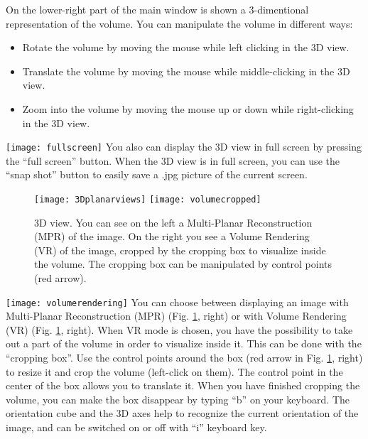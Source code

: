 On the lower-right part of the main window is shown a 3-dimentional representation of the
volume. You can manipulate the volume in different ways:
\begin{itemize}
\item Rotate the volume by moving the mouse while left clicking in the 3D view.
\item Translate the volume by moving the mouse while middle-clicking in the 3D view.
\item Zoom into the volume by moving the mouse up or down while right-clicking in the 3D
  view.
\end{itemize}

\noindent \texttt{[image: fullscreen]}
You also can display the 3D view in full screen by pressing the ``full screen''
button. When the 3D view is in full screen, you can use the ``snap shot'' button to easily
save a .jpg picture of the current screen.
\ \\

\begin{figure}[htbp]
  \begin{center}
    \texttt{[image: 3Dplanarviews]}
    \hspace{0.7cm}
    \texttt{[image: volumecropped]}
  \end{center}
  \caption{ 3D view. You can see on the left a Multi-Planar Reconstruction (MPR) of the image. On
  the right you see a Volume Rendering (VR) of the image, cropped by the cropping box to
  visualize inside the volume. The cropping box can be manipulated by control points (red arrow).
  \label{fig:3Dview}}
\end{figure}

\noindent \texttt{[image: volumerendering]} You can choose between
displaying an image with Multi-Planar Reconstruction (MPR) (Fig. \ref{fig:3Dview}, right) or with Volume Rendering (VR)
(Fig. \ref{fig:3Dview}, right). When VR mode is chosen, you have the possibility to take
out a part of the volume in order to visualize inside it. This can be done with the ``cropping
box''. Use the control points around the box (red arrow in Fig. \ref{fig:3Dview}, right)
to resize it and crop the volume (left-click on them). The control point in the center of
the box allows you to translate it. When you have finished cropping the volume, you can
make the box disappear by typing ``b'' on your keyboard. The orientation cube and the 3D axes help to recognize the
current orientation of the image, and can be switched on or off with ``i'' keyboard key.
\ \\

